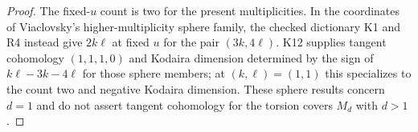 \begin{proof}
The fixed-$u$ count is two for the present multiplicities. In the
coordinates of Viaclovsky's higher-multiplicity sphere family,
the checked dictionary K1 and R4 instead give $2k\ell$ at fixed
$u$ for the pair $(3k,4\ell)$. K12 supplies tangent cohomology
$(1,1,1,0)$ and Kodaira dimension determined by the sign of
$k\ell-3k-4\ell$ for those sphere members; at $(k,\ell)=(1,1)$
this specializes to the count two and negative Kodaira dimension.
These sphere results concern $d=1$ and do not assert tangent
cohomology for the torsion covers $M_d$ with $d>1$.
\end{proof}
